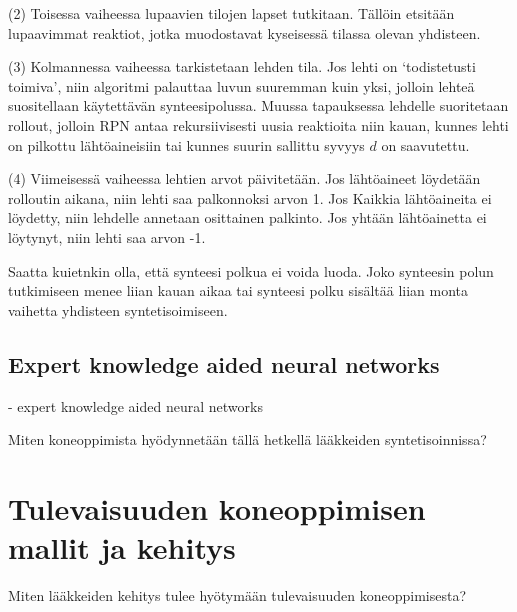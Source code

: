\documentclass[finnish,twoside,censored,subject,sw-line]{HYthesisML}
\begin{document}
(2) Toisessa vaiheessa lupaavien tilojen lapset tutkitaan. Tällöin etsitään lupaavimmat reaktiot, jotka muodostavat
kyseisessä tilassa olevan yhdisteen.

(3) Kolmannessa vaiheessa tarkistetaan lehden tila. Jos lehti on `todistetusti toimiva', niin algoritmi palauttaa
luvun suuremman kuin yksi, jolloin lehteä suositellaan käytettävän synteesipolussa. Muussa tapauksessa lehdelle
suoritetaan rollout, jolloin RPN antaa rekursiivisesti uusia reaktioita niin kauan, kunnes lehti on pilkottu
lähtöaineisiin tai kunnes suurin sallittu syvyys $d$ on saavutettu.

(4) Viimeisessä vaiheessa lehtien arvot päivitetään. Jos lähtöaineet löydetään rolloutin aikana, niin lehti saa
palkonnoksi arvon 1. Jos Kaikkia lähtöaineita ei löydetty, niin lehdelle annetaan osittainen palkinto. Jos yhtään
lähtöainetta ei löytynyt, niin lehti saa arvon -1.

Saatta kuietnkin olla, että synteesi polkua ei voida luoda. Joko synteesin polun tutkimiseen menee liian kauan
aikaa tai synteesi polku sisältää liian monta vaihetta yhdisteen syntetisoimiseen.

\section{Expert knowledge aided neural networks}
- expert knowledge aided neural networks~\cite{10.1145/3450439.3451879}

Miten koneoppimista hyödynnetään tällä hetkellä lääkkeiden syntetisoinnissa?~\cite{SeglerMarwinHS2018Pcsw,10.1145/3219819.3219882,10.1145/3450439.3451879}

\chapter{Tulevaisuuden koneoppimisen mallit ja kehitys}

Miten lääkkeiden kehitys tulee hyötymään tulevaisuuden koneoppimisesta?~\cite{ButlerKeithT2018Mlfm}

\cleardoublepage                          %
{}  %
\printbibliography

\backmatter
\end{document}
